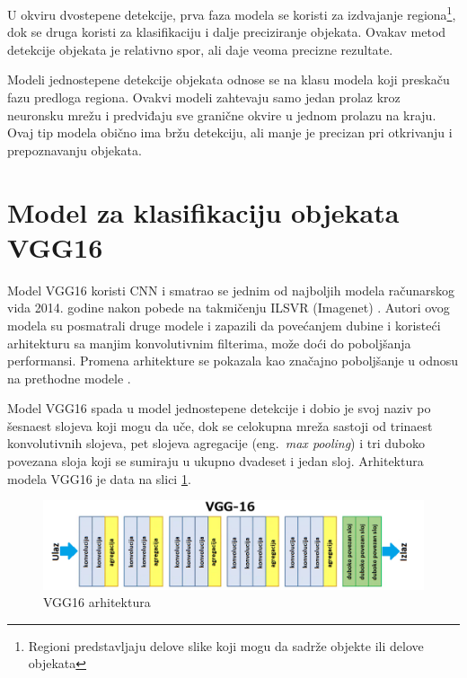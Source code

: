 \documentclass[12pt,oneside]{memoir}
\begin{document}
U okviru dvostepene detekcije, prva faza modela se koristi za izdvajanje regiona\footnote{Regioni predstavljaju delove slike koji mogu da sadrže objekte ili delove objekata}, dok se druga koristi za klasifikaciju i dalje preciziranje objekata. Ovakav metod detekcije objekata je relativno spor, ali daje veoma precizne rezultate.

Modeli jednostepene detekcije objekata odnose se na klasu modela koji preskaču fazu predloga regiona. Ovakvi modeli zahtevaju samo jedan prolaz kroz neuronsku mrežu i predviđaju sve granične okvire u jednom prolazu na kraju. Ovaj tip modela obično ima bržu detekciju, ali manje je precizan pri otkrivanju i prepoznavanju objekata.


\section{Model za klasifikaciju objekata VGG16}

Model VGG16 koristi CNN i smatrao se jednim od najboljih modela računarskog vida 2014. godine nakon pobede na takmičenju ILSVR (Imagenet) \cite{simonyan2014very}. Autori ovog modela su posmatrali druge modele i zapazili da povećanjem dubine i koristeći arhitekturu sa manjim konvolutivnim filterima, može doći do poboljšanja performansi. Promena arhitekture se pokazala kao značajno poboljšanje u odnosu na prethodne modele \cite{simonyan2014very}. 

Model VGG16 spada u model jednostepene detekcije i dobio je svoj naziv po šesnaest slojeva koji mogu da uče, dok se celokupna mreža sastoji od trinaest konvolutivnih slojeva, pet slojeva agregacije (eng.~\textit{max pooling}) i tri duboko povezana sloja koji se sumiraju u ukupno dvadeset i jedan sloj. Arhitektura modela VGG16 je data na slici \ref{fig:section2_vgg16}.

\begin{figure}[ht]
    \centering
    \includegraphics[width=1\textwidth]{matfmaster/glava2/vgg16_2.png}
    \caption{VGG16 arhitektura}
    \label{fig:section2_vgg16}
\end{figure}
\end{document}
